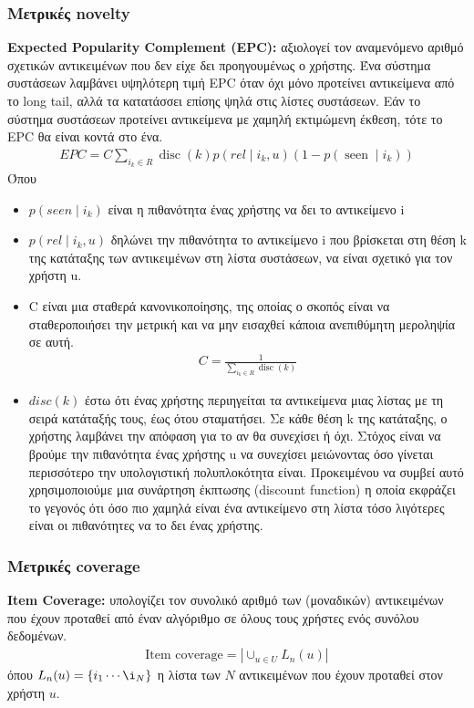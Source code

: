 \subsubsection{Μετρικές novelty}
\noindent\textbf{Expected Popularity Complement (EPC):} \cite{vargasRankRelevanceNovelty2011} αξιολογεί τον αναμενόμενο αριθμό σχετικών αντικειμένων που δεν είχε δει προηγουμένως ο χρήστης. Ένα
σύστημα συστάσεων λαμβάνει υψηλότερη τιμή EPC όταν όχι μόνο προτείνει αντικείμενα από το long tail,
αλλά τα κατατάσσει επίσης ψηλά στις λίστες συστάσεων. Εάν το σύστημα συστάσεων προτείνει αντικείμενα
με χαμηλή εκτιμώμενη έκθεση, τότε το EPC θα είναι κοντά στο ένα. 
\begin{align}
	{EPC}=C \sum_{i_{k} \in R} \operatorname{disc}(k) p\left(r e l \mid i_{k}, u\right)\left(1-p\left(\operatorname{seen} \mid i_{k}\right)\right)
\end{align}
Όπου \begin{itemize}
	\item $ p\left(seen\mid i_k\right) $ είναι η πιθανότητα ένας χρήστης να δει το αντικείμενο i 
	\item $ p\left(rel\mid i_k,u\right) $ δηλώνει την πιθανότητα το αντικείμενο i που βρίσκεται στη θέση k της κατάταξης των αντικειμένων στη λίστα συστάσεων, να είναι σχετικό για τον χρήστη u.
	\item C είναι μια σταθερά κανονικοποίησης, της οποίας ο σκοπός είναι να σταθεροποιήσει την μετρική και να μην εισαχθεί κάποια ανεπιθύμητη μεροληψία σε αυτή.
	\begin{align*}
	C = \frac{1}{\sum_{i_{k} \in R} \operatorname{disc}(k)}
    \end{align*} 
\item $ disc\left(k\right) $ έστω ότι ένας χρήστης περιηγείται τα αντικείμενα μιας λίστας με τη σειρά κατάταξής τους, έως ότου σταματήσει. Σε κάθε θέση k της κατάταξης, ο χρήστης λαμβάνει την απόφαση για το αν θα συνεχίσει ή όχι. Στόχος είναι να βρούμε την πιθανότητα ένας χρήστης u να συνεχίσει μειώνοντας όσο γίνεται περισσότερο την υπολογιστική πολυπλοκότητα είναι. Προκειμένου να συμβεί αυτό χρησιμοποιούμε μια συνάρτηση έκπτωσης (discount function) η οποία εκφράζει το γεγονός ότι όσο πιο χαμηλά είναι ένα αντικείμενο στη λίστα τόσο λιγότερες είναι οι πιθανότητες να το δει ένας χρήστης.
\end{itemize}
\subsubsection{Μετρικές coverage}
\noindent\textbf{Item Coverage:} \cite{adomaviciusImprovingAggregateRecommendation2012} υπολογίζει τον συνολικό αριθμό των (μοναδικών) αντικειμένων που έχουν προταθεί από έναν αλγόριθμο σε όλους τους χρήστες ενός συνόλου δεδομένων.
\begin{align}
	\text{Item coverage} = |\cup_{u \in U}L_{n}(u)|
\end{align}
όπου $  L_{n}(u) = \left\lbrace i_1 \cdots \i_N \right\rbrace $ η λίστα των $ N $ αντικειμένων που έχουν προταθεί στον χρήστη $ u $.
\newpage
